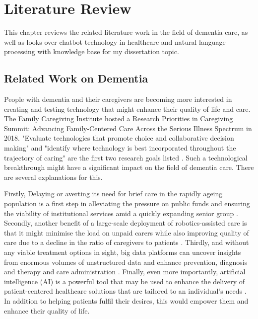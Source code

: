 \def\baselinestretch{1}

\chapter{Literature Review}

\def\baselinestretch{1.44}


This chapter reviews the related literature work in the field of dementia care, as well as looks over chatbot technology in healthcare and natural language processing with knowledge base for my dissertation topic. 
   
\smallskip

\goodbreak
\section{Related Work on Dementia}
People with dementia and their caregivers are becoming more interested in creating and testing technology that might enhance their quality of life and care. The Family Caregiving Institute hosted a Research Priorities in Caregiving Summit: Advancing Family-Centered Care Across the Serious Illness Spectrum in 2018. "Evaluate technologies that promote choice and collaborative decision making" and "identify where technology is best incorporated throughout the trajectory of caring" are the first two research goals listed \citep{three}. Such a technological breakthrough might have a significant impact on the field of dementia care. There are several explanations for this. 

Firstly, Delaying or averting its need for brief care in the rapidly ageing population is a first step in alleviating the pressure on public funds and ensuring the viability of institutional services amid a quickly expanding senior group \citep{lit1}. Secondly, another benefit of a large-scale deployment of robotics-assisted care is that it might minimise the load on unpaid carers while also improving quality of care due to a decline in the ratio of caregivers to patients \citep{int1}. Thirdly, and without any viable treatment options in sight, big data platforms can uncover insights from enormous volumes of unstructured data and enhance prevention, diagnosis and therapy and care administration \citep{lit2}. Finally, even more importantly, artificial intelligence (AI) is a powerful tool that may be used to enhance the delivery of patient-centered healthcare solutions that are tailored to an individual's needs \citep{lit3}. In addition to helping patients fulfil their desires, this would empower them and enhance their quality of life. 

